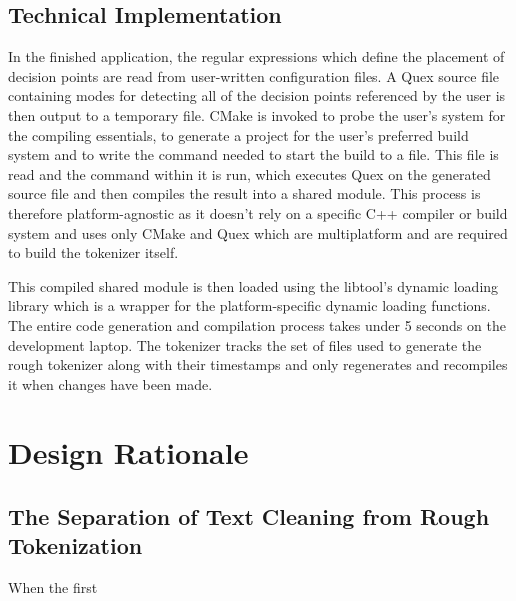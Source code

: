 \subsection{Technical Implementation}
\label{ssec:impl-roughtok-technical}

In the finished application, the regular expressions which define the placement
of decision points are read from user-written configuration files. A Quex
source file containing modes for detecting all of the decision points
referenced by the user is then output to a temporary file. CMake is invoked to
probe the user's system for the compiling essentials, to generate a project for
the user's preferred build system and to write the command needed to start the
build to a file. This file is read and the command within it is run, which
executes Quex on the generated source file and then compiles the result into a
shared module. This process is therefore platform-agnostic as it doesn't rely
on a specific C++ compiler or build system and uses only CMake and Quex which
are multiplatform and are required to build the tokenizer itself.

This compiled shared module is then loaded using the libtool's dynamic loading
library which is a wrapper for the platform-specific dynamic loading functions.
The entire code generation and compilation process takes under 5 seconds on the
development laptop. The tokenizer tracks the set of files used to generate the
rough tokenizer along with their timestamps and only regenerates and recompiles
it when changes have been made.

\section{Design Rationale}
\label{sec:impl-ratio}

\subsection{The Separation of Text Cleaning from Rough Tokenization}

When the first 
